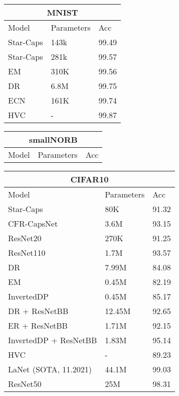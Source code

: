 \documentclass{article}
\begin{document}
\begin{tabular}{lll}
	\hline
	\multicolumn{3}{c}{MNIST}\\
	\hline
	Model     & Parameters & Acc \\
	\hline
	Star-Caps &  143k & 99.49 \\
	Star-Caps &  281k & 99.57 \\
	EM & 310K & 99.56 \\
	DR & 6.8M & 99.75 \\
	ECN & 161K & 99.74 \\
	HVC & -   & 99.87 \\
	\hline
\end{tabular}

\begin{tabular}{lll}
	\hline
	\multicolumn{3}{c}{smallNORB}\\
	\hline
	Model     & Parameters & Acc \\
	\hline
	\hline
\end{tabular}

\begin{tabular}{lll}
	\hline
	\multicolumn{3}{c}{CIFAR10}\\
	\hline
	Model     & Parameters & Acc \\
	\hline
	Star-Caps &  80K & 91.32 \\
	CFR-CapsNet & 3.6M & 93.15 \\
	ResNet20 & 270K & 91.25 \\
	ResNet110 & 1.7M & 93.57 \\
	DR & 7.99M & 84.08 \\
	EM & 0.45M  & 82.19 \\
	InvertedDP & 0.45M & 85.17 \\
	DR + ResNetBB & 12.45M & 92.65 \\
	ER + ResNetBB & 1.71M  & 92.15 \\
	InvertedDP + ResNetBB & 1.83M & 95.14 \\
	HVC & - & 89.23 \\
	LaNet (SOTA, 11.2021) & 44.1M & 99.03 \\
	ResNet50 & 25M & 98.31 \\
	\hline
\end{tabular}
\end{document}
